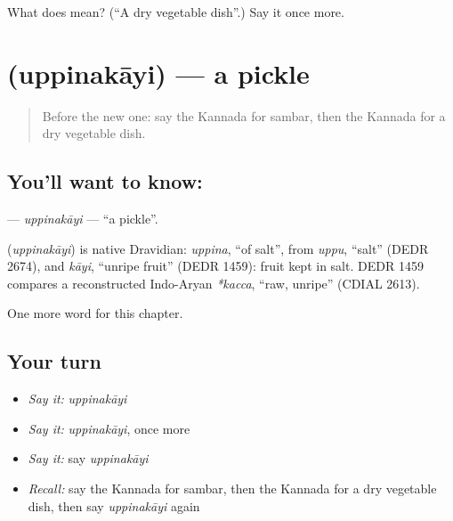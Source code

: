 \begin{tcolorbox}[breakable,colback=teal!4,colframe=teal!35!black,title={Before you move on}]
What does  mean? (\textquotedblleft{}A dry vegetable dish\textquotedblright{}.) Say it once more.
\end{tcolorbox}
\section[\texorpdfstring{\kn{ಉಪ್ಪಿನಕಾಯಿ} (uppinakāyi)}{ಉಪ್ಪಿನಕಾಯಿ (uppinakāyi)}]{ (uppinakāyi) — a pickle}

\label{lesson:KA-C122-uppinakayi}



\begin{quote}
Before the new one: say the Kannada for sambar, then the Kannada for a dry vegetable dish.
\end{quote}

\subsection*{You'll want to know: }
\textbf{} — \emph{uppinakāyi} — \textquotedblleft{}a pickle\textquotedblright{}.

\begin{cousinweb}
\textbf{} (\emph{uppinakāyi}) is native Dravidian: \emph{uppina}, \textquotedblleft{}of salt\textquotedblright{}, from \emph{uppu}, \textquotedblleft{}salt\textquotedblright{} (DEDR 2674), and \emph{kāyi}, \textquotedblleft{}unripe fruit\textquotedblright{} (DEDR 1459): fruit kept in salt. DEDR 1459 compares a reconstructed Indo-Aryan \emph{*kacca}, \textquotedblleft{}raw, unripe\textquotedblright{} (CDIAL 2613).
\end{cousinweb}

\begin{grammarlens}[title={What you've built}]
One more word for this chapter.
\end{grammarlens}

\subsection*{Your turn}
\begin{itemize}
\raggedright
  \item \emph{Say it:} \emph{uppinakāyi}
  \item \emph{Say it:} \emph{uppinakāyi}, once more
  \item \emph{Say it:} say \emph{uppinakāyi}
  \item \emph{Recall:} say the Kannada for sambar, then the Kannada for a dry vegetable dish, then say \emph{uppinakāyi} again
\end{itemize}

